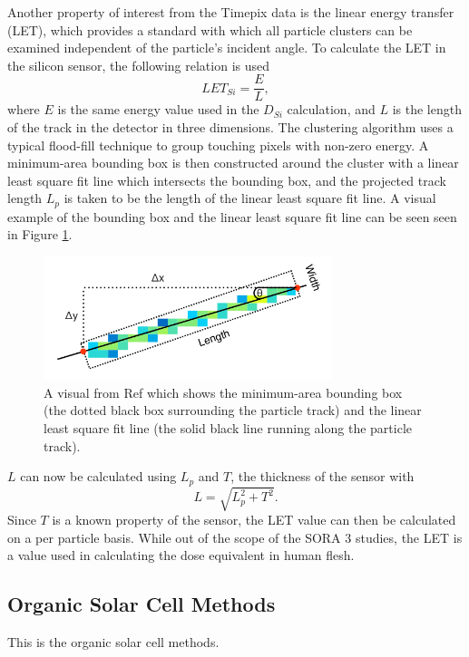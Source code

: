 Another property of interest from the Timepix data is the linear energy transfer (LET), which provides a standard with which all particle clusters can be examined independent of the particle's incident angle.
To calculate the LET in the silicon sensor, the following relation is used
\begin{equation*}
  LET_{Si} = \dfrac{E}{L},
\end{equation*}
where $E$ is the same energy value used in the $D_{Si}$ calculation, and $L$ is the length of the track in the detector in three dimensions.
The clustering algorithm uses a typical flood-fill technique to group touching pixels with non-zero energy.
A minimum-area bounding box is then constructed around the cluster with a linear least square fit line which intersects the bounding box, and the projected track length $L_p$ is taken to be the length of the linear least square fit line.
A visual example of the bounding box and the linear least square fit line can be seen seen in Figure \ref{fig:stuart-track-example}.
\begin{figure}[h!]
	\begin{center}
		\includegraphics[width=0.75\textwidth]{figures/stuart-track-example.png}
		\caption{A visual from Ref \cite{stuart-thesis} which shows the minimum-area bounding box (the dotted black box surrounding the particle track) and the linear least square fit line (the solid black line running along the particle track).}
		\label{fig:stuart-track-example}
	\end{center}
\end{figure}
$L$ can now be calculated using $L_p$ and $T$, the thickness of the sensor with
\begin{equation*}
  L = \sqrt{L_p^2 + T^2}.
\end{equation*}
Since $T$ is a known property of the sensor, the LET value can then be calculated on a per particle basis.
While out of the scope of the SORA 3 studies, the LET is a value used in calculating the dose equivalent in human flesh.

\subsection{Organic Solar Cell Methods}
\label{sec:Solar-Cell-Methods}

This is the organic solar cell methods.

